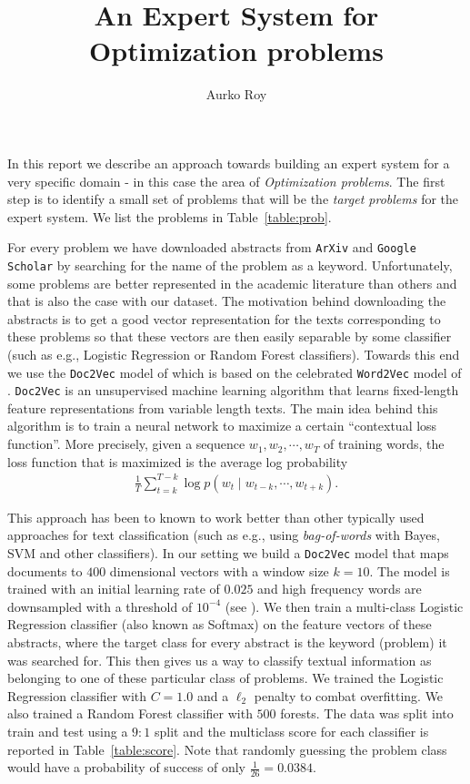 \documentclass[a4paper,10pt]{article}
\title{An Expert System for Optimization problems}
\author{Aurko Roy}
\begin{document}
\maketitle
In this report we describe an approach towards building an expert system
for a very specific domain - in this case the area of \emph{Optimization problems}.
The first step is to identify a small set of problems that will be the \emph{target 
problems} for the expert system. We list the problems in Table~\ref{table:prob}. 

For every problem we have downloaded abstracts from \texttt{ArXiv} and \texttt{Google Scholar} 
by searching for the name of the problem as a keyword. Unfortunately, some problems are
better represented in the academic literature than others and that is also the case
with our dataset. The motivation behind downloading the abstracts is to get a 
good vector representation for the texts corresponding to these problems so that
these vectors are then easily separable by some classifier (such as e.g., Logistic
Regression or Random Forest classifiers). Towards this end we use the \texttt{Doc2Vec}
model of \cite{DBLP:journals/corr/LeM14} which is based on the celebrated \texttt{Word2Vec}
model of \cite{mikolov2013distributed}. \texttt{Doc2Vec} is an unsupervised machine
learning algorithm that learns fixed-length feature representations from variable length
texts. The main idea behind this algorithm is to train a neural network to maximize 
a certain ``contextual loss function''. More precisely, given a sequence
\(w_1, w_2, \cdots, w_T\) of training words, the loss function that is maximized is the
average log probability
\begin{align*}
 \frac{1}{T}\sum_{t=k}^{T-k} \log p\left(w_t \mid w_{t-k}, \cdots, w_{t + k}\right).
\end{align*}

This approach has been to known to work better than other typically used approaches for text classification
(such as e.g., using \emph{bag-of-words} with Bayes, SVM and other classifiers). In our setting
we build a \texttt{Doc2Vec} model that maps documents to \(400\) dimensional vectors with a window
size \(k = 10\). The model is trained with an initial learning rate of \(0.025\) and high frequency
words are downsampled with a threshold of \(10^{-4}\) (see \cite{mikolov2013distributed}). We then train 
a multi-class Logistic Regression classifier (also
known as Softmax) on the feature vectors of these abstracts, where the target 
class for every abstract is the keyword (problem) it was searched for. This then gives us a way
to classify textual information as belonging to one of these particular class of problems. 
We trained the Logistic Regression classifier with \(C=1.0\) and a 
\(\ell_2\) penalty to combat overfitting. We also trained a Random Forest classifier
with \(500\) forests. The data was split into train and test using a \(9:1\) split and the 
multiclass score for each classifier is reported in Table~\ref{table:score}. Note that 
randomly guessing the problem class would have a probability of success of only \(\frac{1}{26} = 0.0384\).
\end{document}
